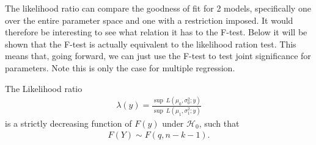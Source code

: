 The likelihood ratio can compare the goodness of fit for 2 models, specifically one over the entire parameter space and one with a restriction imposed.
It would therefore be interesting to see what relation it has to the F-test. 
Below it will be shown that the F-test is actually equivalent to the likelihood ration test.
This means that, going forward, we can just use the F-test to test joint significance for parameters.
Note this is only the case for multiple regression. 

\begin{theorem}
\label{th:Likelihood_ratio_linear_models}
    The Likelihood ratio
    \begin{align*}
        \lambda(y) = \frac{\sup \ L(\mu_0, \sigma_0^2; y)}{\sup \ L(\mu_1, \sigma_1^2; y)}
    \end{align*}
    is a strictly decreasing function of $F(y)$ under $\mathcal{H}_0$, such that
    \begin{align*}
        F(Y) \sim F(q, n-k-1).
    \end{align*}
\end{theorem}

